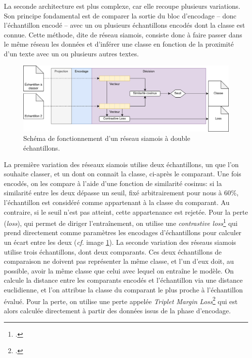 La seconde architecture est plus complexe, car elle recoupe plusieurs variations. Son principe fondamental est de comparer la sortie du bloc d'encodage -- donc l'échantillon encodé -- avec un ou plusieurs échantillons encodés dont la classe est connue. Cette méthode, dite de réseau siamois, consiste donc à faire passer dans le même réseau les données et d'inférer une classe en fonction de la proximité d'un texte avec un ou plusieurs autres textes. 


\begin{figure}[ht]
    \centering
    \includegraphics[width=\linewidth]{figures/chap4/contrastive.png}
    \caption{Schéma de fonctionnement d'un réseau siamois à double échantillons.}
    \label{fig:chap4:reseau:ContrastiveLoss}
\end{figure}

La première variation des réseaux siamois utilise deux échantillons, un que l'on souhaite classer, et un dont on connait la classe, ci-après le comparant. Une fois encodés, on les compare à l'aide d'une fonction de similarité cosinus: si la similarité entre les deux dépasse un seuil, fixé arbitrairement pour nous à 60\%, l'échantillon est considéré comme appartenant à la classe du comparant. Au contraire, si le seuil n'est pas atteint, cette appartenance est rejetée. Pour la perte (\textit{loss}), qui permet de diriger l'entraînement, on utilise une \textit{contrastive loss}\footcite[Entre autres, ]{khosla_supervised_2021} qui prend directement comme paramètres les encodages d'échantillons pour calculer un écart entre les deux (\textit{cf.} image \ref{fig:chap4:reseau:ContrastiveLoss}). La seconde variation des réseaus siamois utilise trois échantillons, dont deux comparants. Ces deux échantillons de comparaison ne doivent pas représenter la même classe, et l'un d'eux doit, au possible, avoir la même classe que celui avec lequel on entraîne le modèle. On calcule la distance entre les comparants encodés et l'échantillon via une distance euclidienne, et l'on attribue la classe du comparant le plus proche à l'échantillon évalué. Pour la perte, on utilise une perte appelée \textit{Triplet Margin Loss}\footcite{hermans_defense_2017} qui est alors calculée directement à partir des données issus de la phase d'encodage.

